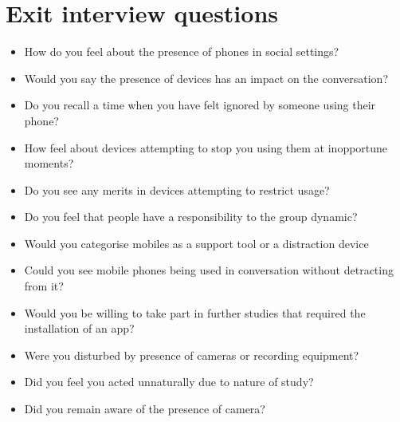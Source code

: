 


\section{Exit interview questions}\label{app:studyinfo-pub interview}

\begin{itemize}
    \item How do you feel about the presence of phones in social settings?
    \item Would you say the presence of devices has an impact on the conversation?
    \item Do you recall a time when you have felt ignored by someone using their phone?
    \item How feel about devices attempting to stop you using them at inopportune moments?
    \item Do you see any merits in devices attempting to restrict usage?
    \item Do you feel that people have a responsibility to the group dynamic?
    \item Would you categorise mobiles as a support tool or a distraction device
    \item Could you see mobile phones being used in conversation without detracting from it?
    \item Would you be willing to take part in further studies that required the installation of an app?
    \item Were you disturbed by presence of cameras or recording equipment?
    \item Did you feel you acted unnaturally due to nature of study?
    \item Did you remain aware of the presence of camera?
\end{itemize}





% 
% 



